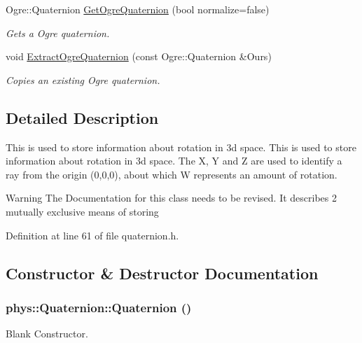 \begin{DoxyCompactItemize}
Ogre::Quaternion \hyperlink{classphys_1_1Quaternion_ad7501687205092c203d2358ca53d3bfe}{GetOgreQuaternion} (bool normalize=false)
\begin{DoxyCompactList}\small\item\em Gets a Ogre quaternion. \item\end{DoxyCompactList}\item 
void \hyperlink{classphys_1_1Quaternion_a942fab675a0b124e1dc5e2febab113e6}{ExtractOgreQuaternion} (const Ogre::Quaternion \&Ours)
\begin{DoxyCompactList}\small\item\em Copies an existing Ogre quaternion. \item\end{DoxyCompactList}\end{DoxyCompactItemize}


\subsection{Detailed Description}
This is used to store information about rotation in 3d space. This is used to store information about rotation in 3d space. The X, Y and Z are used to identify a ray from the origin (0,0,0), about which W represents an amount of rotation. \begin{DoxyWarning}{Warning}
The Documentation for this class needs to be revised. It describes 2 mutually exclusive means of storing 
\end{DoxyWarning}


Definition at line 61 of file quaternion.h.



\subsection{Constructor \& Destructor Documentation}
\hypertarget{classphys_1_1Quaternion_aca4ee6fd6d3967f06cc4a32361fa5a62}{
\subsubsection[{Quaternion}]{\setlength{\rightskip}{0pt plus 5cm}phys::Quaternion::Quaternion ()}}
\label{df/d8c/classphys_1_1Quaternion_aca4ee6fd6d3967f06cc4a32361fa5a62}


Blank Constructor. 

